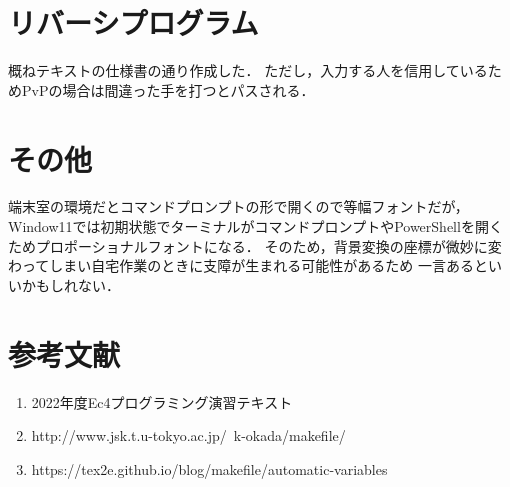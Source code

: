\documentclass[titlepage]{jarticle}
\begin{document}
\section*{リバーシプログラム}
概ねテキストの仕様書の通り作成した．
ただし，入力する人を信用しているためPvPの場合は間違った手を打つとパスされる．
\section*{その他}
端末室の環境だとコマンドプロンプトの形で開くので等幅フォントだが，
Window11では初期状態でターミナルがコマンドプロンプトやPowerShellを開くためプロポーショナルフォントになる．
そのため，背景変換の座標が微妙に変わってしまい自宅作業のときに支障が生まれる可能性があるため
一言あるといいかもしれない．
\section*{参考文献}
\begin{enumerate}
  \item 2022年度Ec4プログラミング演習テキスト
  \item http://www.jsk.t.u-tokyo.ac.jp/~k-okada/makefile/
  \item https://tex2e.github.io/blog/makefile/automatic-variables
\end{enumerate}
\end{document}
